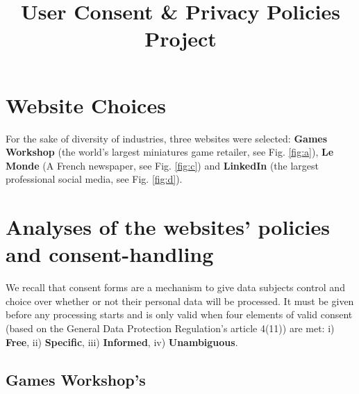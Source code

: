 \documentclass[twocolumn, letterpaper]{scrartcl}
\begin{document}
    \title{\color{seablue}User Consent \& Privacy Policies Project}

	\maketitle
	
    
    
    \section*{Website Choices}
        
         For the sake of diversity of industries, three websites were selected: \textbf{Games Workshop}\cite{GW} (the world's largest miniatures game retailer, see Fig. \ref{fig:a}), \textbf{Le Monde}\cite{LM} (A French newspaper, see Fig. \ref{fig:c}) and \textbf{LinkedIn}\cite{LD} (the largest professional social media, see Fig. \ref{fig:d}).
	
	\section{Analyses of the websites' policies and consent-handling}
	
	    We recall that consent forms are a mechanism to give data subjects control and choice over whether or not their personal data will be processed. It must be given before any processing starts and is only valid when four elements of valid consent (based on the General Data Protection Regulation's article 4(11)) are met: i) \textbf{Free}, ii) \textbf{Specific}, iii) \textbf{Informed}, iv) \textbf{Unambiguous}.
	
    \subsection*{Games Workshop's}
\end{document}
